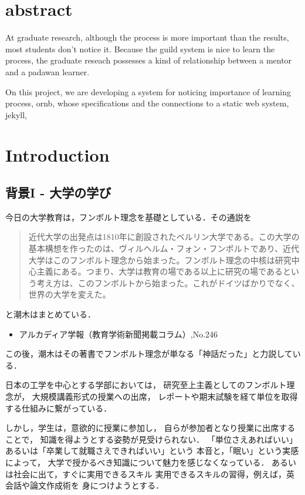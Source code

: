 \documentclass{jsarticle}
\author{\texttt{S}}
\date{}
\title{}
\begin{document}
\section{abstract}
\label{sec:orgc0433c4}
At graduate research, 
although the process is more important than the results,
most students don't notice it.
Because the guild system is nice to learn the process,
the graduate reseach possesses a kind of
relationship between 
a mentor and a padawan learner.

On this project, 
we are developing a system for
noticing importance of learning process,
ornb, whose specifications and 
the connections to a static web system, jekyll,

\section{Introduction}
\label{sec:orgad06064}
\subsection{背景I - 大学の学び}
\label{sec:orga8b2152}
今日の大学教育は，フンボルト理念を基礎としている．その通説を
\begin{quote}
近代大学の出発点は1810年に創設されたベルリン大学である。この大学の基本構想を作ったのは、ヴィルヘルム・フォン・フンボルトであり、近代大学はこのフンボルト理念から始まった。フンボルト理念の中核は研究中心主義にある。つまり、大学は教育の場である以上に研究の場であるという考え方は、このフンボルトから始まった。これがドイツばかりでなく、世界の大学を変えた。
\end{quote}
と潮木はまとめている．
\begin{itemize}
\item アルカディア学報（教育学術新聞掲載コラム）,No.246
\end{itemize}
この後，潮木はその著書でフンボルト理念が単なる「神話だった」と力説している．

日本の工学を中心とする学部においては，
研究至上主義としてのフンボルト理念が，
大規模講義形式の授業への出席，
レポートや期末試験を経て単位を取得する仕組みに繋がっている．

しかし，学生は，意欲的に授業に参加し，
自らが参加者となり授業に出席することで，
知識を得ようとする姿勢が見受けられない．
「単位さえあればいい」あるいは「卒業して就職さえできればいい」という
本音と，「眠い」という実感によって，
大学で授かるべき知識について魅力を感じなくなっている．
あるいは社会に出て，すぐに実用できるスキル
実用できるスキルの習得，例えば，英会話や論文作成術を
身につけようとする．
\end{document}
